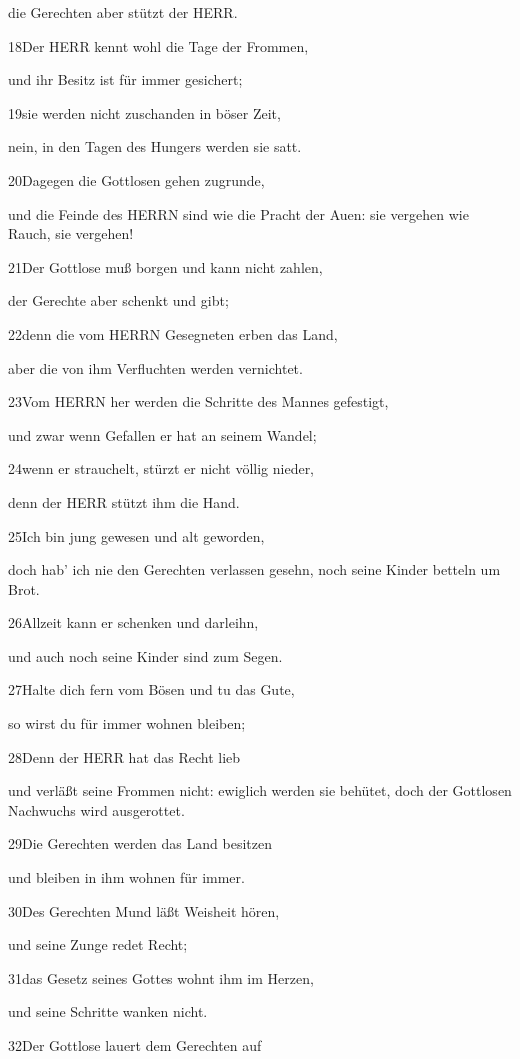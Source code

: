 die Gerechten aber stützt der HERR.

18Der HERR kennt wohl die Tage der Frommen,

und ihr Besitz ist für immer gesichert;

19sie werden nicht zuschanden in böser Zeit,

nein, in den Tagen des Hungers werden sie satt.

20Dagegen die Gottlosen gehen zugrunde,

und die Feinde des HERRN sind wie die Pracht der Auen: sie vergehen wie
Rauch, sie vergehen!

21Der Gottlose muß borgen und kann nicht zahlen,

der Gerechte aber schenkt und gibt;

22denn die vom HERRN Gesegneten erben das Land,

aber die von ihm Verfluchten werden vernichtet.

23Vom HERRN her werden die Schritte des Mannes gefestigt,

und zwar wenn Gefallen er hat an seinem Wandel;

24wenn er strauchelt, stürzt er nicht völlig nieder,

denn der HERR stützt ihm die Hand.

25Ich bin jung gewesen und alt geworden,

doch hab' ich nie den Gerechten verlassen gesehn, noch seine Kinder
betteln um Brot.

26Allzeit kann er schenken und darleihn,

und auch noch seine Kinder sind zum Segen.

27Halte dich fern vom Bösen und tu das Gute,

so wirst du für immer wohnen bleiben;

28Denn der HERR hat das Recht lieb

und verläßt seine Frommen nicht: ewiglich werden sie behütet, doch der
Gottlosen Nachwuchs wird ausgerottet.

29Die Gerechten werden das Land besitzen

und bleiben in ihm wohnen für immer.

30Des Gerechten Mund läßt Weisheit hören,

und seine Zunge redet Recht;

31das Gesetz seines Gottes wohnt ihm im Herzen,

und seine Schritte wanken nicht.

32Der Gottlose lauert dem Gerechten auf

